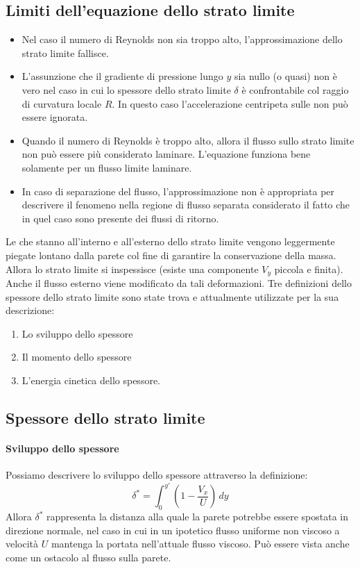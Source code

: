\subsection{Limiti dell'equazione dello strato limite}
\begin{itemize}
\item Nel caso il numero di Reynolds non sia troppo alto, l'approssimazione dello strato limite fallisce.
\item L'assunzione che il gradiente di pressione lungo $y$ sia nullo (o quasi) non è vero nel caso in cui lo spessore dello strato limite $\delta$ è confrontabile col raggio di curvatura locale $R$. In questo caso l'accelerazione centripeta sulle  non può essere ignorata.
\item Quando il numero di Reynolds è troppo alto, allora il flusso sullo strato limite non può essere più considerato laminare. L'equazione funziona bene solamente per un flusso limite laminare.
\item In caso di separazione del flusso, l'approssimazione non è appropriata per descrivere il fenomeno nella regione di flusso separata considerato il fatto che in quel caso sono presente dei flussi di ritorno.
\end{itemize}

Le  che stanno all'interno e all'esterno dello strato limite vengono leggermente piegate lontano dalla parete col fine di garantire la conservazione della massa. Allora lo strato limite si inspessisce (esiste una componente $V_y$ piccola e finita). Anche il flusso esterno viene modificato da tali deformazioni.
Tre definizioni dello spessore dello strato limite sono state trova e attualmente utilizzate per la sua descrizione:
\begin{enumerate}
\item Lo sviluppo dello spessore
\item Il momento dello spessore
\item L'energia cinetica dello spessore.
\end{enumerate}

\subsection{Spessore dello strato limite}
\paragraph{Sviluppo dello spessore}
Possiamo descrivere lo sviluppo dello spessore attraverso la definizione:
\begin{equation}
\delta^* = \int_0^{y'}\left(1-\frac{V_x}{U}\right)\,dy
\end{equation}
Allora $\delta^*$ rappresenta la distanza alla quale la parete potrebbe essere spostata in direzione normale, nel caso in cui in un ipotetico flusso uniforme non viscoso a velocità $U$ mantenga la portata nell'attuale flusso viscoso.
Può essere vista anche come un ostacolo al flusso sulla parete.


